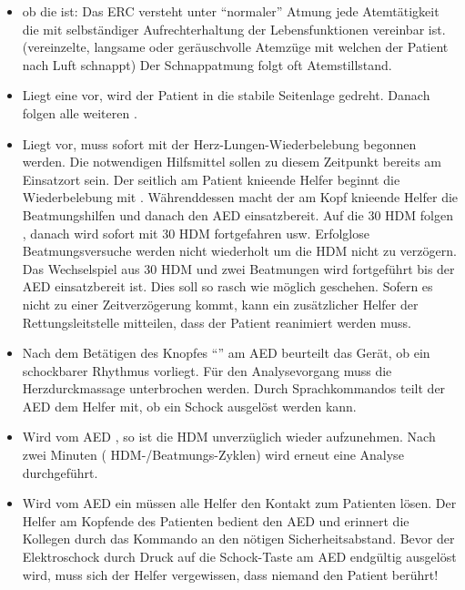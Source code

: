 {\begin{itemize}
  \begin{itemize}
    \item {}: Bewegungen des Brustkorbs
    \item {}: Atemgeräusche
    \item {}: Luftstrom der Ausatemluft
    \end{itemize}
  \item {} ob die  ist: Das
  ERC versteht unter \enquote{normaler} Atmung jede
  Atemtätigkeit die mit selbständiger Aufrechterhaltung der
  Lebensfunktionen vereinbar ist. 
  (vereinzelte, langsame oder geräuschvolle Atemzüge mit
  welchen der Patient nach Luft schnappt)
   Der Schnappatmung folgt oft
  Atemstillstand.
  \item Liegt eine  vor, wird der Patient
  in die stabile Seitenlage gedreht. Danach folgen alle
  weiteren {\TxMassVit}.
  \item Liegt  vor, muss sofort mit
  der Herz-Lungen-Wiederbe\-lebung begonnen werden. Die
  notwendigen Hilfsmittel sollen zu diesem Zeitpunkt bereits
  am Einsatzort sein. Der seitlich am Patient knieende
  Helfer beginnt die Wiederbelebung mit . Währenddessen macht der am Kopf
  knieende Helfer die Beatmungshilfen und danach den AED
  einsatzbereit. Auf die 30 HDM folgen ,
  danach wird sofort mit 30 HDM fortgefahren usw. 
  Erfolglose Beatmungsversuche werden
  nicht wiederholt um die HDM nicht zu verzögern. Das
  Wechselspiel aus 30 HDM und zwei Beatmungen wird
  fortgeführt bis der AED einsatzbereit ist. Dies soll so
  rasch wie möglich geschehen. Sofern es nicht zu einer
  Zeitverzögerung kommt, kann ein zusätzlicher Helfer der 
  Rettungsleitstelle mitteilen, dass der Patient
  reanimiert werden muss.
  \item Nach dem Betätigen des Knopfes
  \enquote{} am AED beurteilt das Gerät, ob
  ein schockbarer Rhythmus vorliegt. Für den
  Analysevorgang muss die Herzdurckmassage unterbrochen werden. 
  Durch
  Sprachkommandos teilt der AED dem Helfer mit, ob ein Schock
  ausgelöst werden kann.
  \item Wird vom AED , so ist die
  HDM unverzüglich wieder aufzunehmen. Nach zwei Minuten
  ( HDM-/Beatmungs-Zyklen) wird erneut eine Analyse
  durchgeführt.
  \item Wird vom AED ein  müssen alle
  Helfer den Kontakt zum Patienten lösen. Der Helfer am
  Kopfende des Patienten bedient den AED und erinnert die
  Kollegen durch das  Kommando
   an den nötigen Sicherheitsabstand. Bevor  der
  Elektroschock durch Druck auf die Schock-Taste am AED
  endgültig ausgelöst wird, muss sich der Helfer
  vergewissen, dass niemand den Patient berührt!


\end{itemize}}
